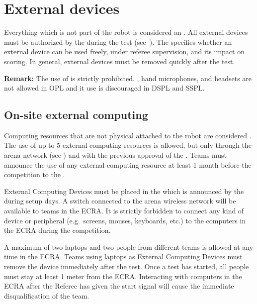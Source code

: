 %
%
\section{External devices}
\label{rule:robot_external_devices}
Everything which is not part of the robot is considered an .
All external devices must be authorized by the  during the  test (see~).
The  specifies whether an external device can be used freely, under referee supervision, and its impact on scoring.
In general, external devices must be removed quickly after the test.

\noindent \textbf{Remark:} The use of  is strictly prohibited. , hand microphones, and headsets are not allowed in OPL and it use is discouraged in DSPL and SSPL.

\subsection{On-site external computing}
Computing resources that are not physical attached to the robot are considered .
The use of up to 5 external computing resources is allowed, but only through the arena network (see ) and with the previous approval of the .
Teams must announce the use of any external computing resource at least 1 month before the competition to the .

External Computing Devices must be placed in the  which is announced by the  during setup days.
A switch connected to the arena wireless network will be available to teams in the ECRA.
It is strictly forbidden to connect any kind of device or peripheral (e.g.~screens, mouses, keyboards, etc.) to the computers in the ECRA during the competition.

A maximum of two laptops and two people from different teams is allowed at any time in the ECRA.
Teams using laptops as External Computing Devices must remove the device immediately after the test.
Once a test has started, all people must stay at least 1 meter from the ECRA.
Interacting with computers in the ECRA after the Referee has given the start signal will cause the immediate disqualification of the team.

